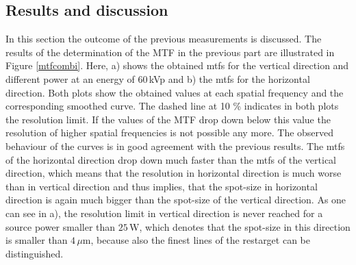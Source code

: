 \subsection{Results and discussion}\label{subsec:targetresults}
In this section the outcome of the previous measurements is discussed. The results of the determination of the MTF in the previous part are illustrated in Figure \ref{mtfcombi}. Here, a) shows the obtained \glspl{mtf} for the vertical direction and different power at an energy of $60\,$kVp and b) the \glspl{mtf} for the horizontal direction. Both plots show the obtained values at each spatial frequency and the corresponding smoothed curve. The dashed line at 10 \% indicates in both plots the resolution limit. If the values of the MTF drop down below this value the resolution of higher spatial frequencies is not possible any more. The observed behaviour of the curves is in good agreement with the previous results. The \glspl{mtf} of the horizontal direction drop down much faster than the \glspl{mtf} of the vertical direction, which means that the resolution in horizontal direction is much worse than in vertical direction and thus implies, that the spot-size in horizontal direction is again much bigger than the spot-size of the vertical direction. As one can see in a), the resolution limit in vertical direction is never reached for a source power smaller than $25\,$W, which denotes that the spot-size in this direction is smaller than $4\, \mu$m, because also the finest lines of the \gls{restarget} can be distinguished.\\  

